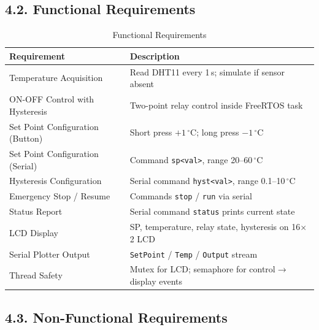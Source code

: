 \documentclass[12pt]{article}
\begin{document}
\subsection*{4.2. Functional Requirements}

\begin{table}[H]
    \centering
    \caption{Functional Requirements}
    \label{tab:functional-requirements}
    \begin{tabular}{|l|l|}
        \hline
        \textbf{Requirement} & \textbf{Description} \\
        \hline
        Temperature Acquisition & Read DHT11 every 1\,s; simulate if sensor absent \\
        \hline
        ON-OFF Control with Hysteresis & Two-point relay control inside FreeRTOS task \\
        \hline
        Set Point Configuration (Button) & Short press $+1\,^{\circ}$C; long press $-1\,^{\circ}$C \\
        \hline
        Set Point Configuration (Serial) & Command \texttt{sp<val>}, range 20--60\,$^{\circ}$C \\
        \hline
        Hysteresis Configuration & Serial command \texttt{hyst<val>}, range 0.1--10\,$^{\circ}$C \\
        \hline
        Emergency Stop / Resume & Commands \texttt{stop} / \texttt{run} via serial \\
        \hline
        Status Report & Serial command \texttt{status} prints current state \\
        \hline
        LCD Display & SP, temperature, relay state, hysteresis on 16$\times$2 LCD \\
        \hline
        Serial Plotter Output & \texttt{SetPoint} / \texttt{Temp} / \texttt{Output} stream \\
        \hline
        Thread Safety & Mutex for LCD; semaphore for control$\to$display events \\
        \hline
    \end{tabular}
\end{table}

\subsection*{4.3. Non-Functional Requirements}
\end{document}
